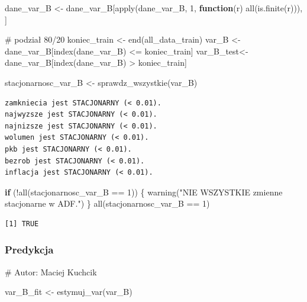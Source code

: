\documentclass[
  polish,
  letterpaper,
  DIV=11,
  numbers=noendperiod]{scrartcl}
\newenvironment{Shaded}{\begin{snugshade}}{\end{snugshade}}
\newcommand{\CommentTok}[1]{\textcolor[rgb]{0.37,0.37,0.37}{#1}}
\newcommand{\ControlFlowTok}[1]{\textcolor[rgb]{0.00,0.23,0.31}{\textbf{#1}}}
\newcommand{\DecValTok}[1]{\textcolor[rgb]{0.68,0.00,0.00}{#1}}
\newcommand{\FunctionTok}[1]{\textcolor[rgb]{0.28,0.35,0.67}{#1}}
\newcommand{\NormalTok}[1]{\textcolor[rgb]{0.00,0.23,0.31}{#1}}
\newcommand{\OtherTok}[1]{\textcolor[rgb]{0.00,0.23,0.31}{#1}}
\newcommand{\SpecialCharTok}[1]{\textcolor[rgb]{0.37,0.37,0.37}{#1}}
\newcommand{\StringTok}[1]{\textcolor[rgb]{0.13,0.47,0.30}{#1}}
\begin{document}
\begin{Shaded}
\begin{Highlighting}[]
\NormalTok{dane\_var\_B }\OtherTok{\textless{}{-}}\NormalTok{ dane\_var\_B[}\FunctionTok{apply}\NormalTok{(dane\_var\_B, }\DecValTok{1}\NormalTok{, }
                         \ControlFlowTok{function}\NormalTok{(r) }\FunctionTok{all}\NormalTok{(}\FunctionTok{is.finite}\NormalTok{(r))), ]}

\CommentTok{\# podział 80/20}
\NormalTok{koniec\_train }\OtherTok{\textless{}{-}} \FunctionTok{end}\NormalTok{(all\_data\_train)}
\NormalTok{var\_B }\OtherTok{\textless{}{-}}\NormalTok{ dane\_var\_B[}\FunctionTok{index}\NormalTok{(dane\_var\_B) }\SpecialCharTok{\textless{}=}\NormalTok{ koniec\_train]}
\NormalTok{var\_B\_test}\OtherTok{\textless{}{-}}\NormalTok{ dane\_var\_B[}\FunctionTok{index}\NormalTok{(dane\_var\_B) }\SpecialCharTok{\textgreater{}}\NormalTok{  koniec\_train]}

\NormalTok{stacjonarnosc\_var\_B }\OtherTok{\textless{}{-}} \FunctionTok{sprawdz\_wszystkie}\NormalTok{(var\_B)}
\end{Highlighting}
\end{Shaded}

\begin{verbatim}
zamkniecia jest STACJONARNY (< 0.01).
najwyzsze jest STACJONARNY (< 0.01).
najnizsze jest STACJONARNY (< 0.01).
wolumen jest STACJONARNY (< 0.01).
pkb jest STACJONARNY (< 0.01).
bezrob jest STACJONARNY (< 0.01).
inflacja jest STACJONARNY (< 0.01).
\end{verbatim}

\begin{Shaded}
\begin{Highlighting}[]
\ControlFlowTok{if}\NormalTok{ (}\SpecialCharTok{!}\FunctionTok{all}\NormalTok{(stacjonarnosc\_var\_B }\SpecialCharTok{==} \DecValTok{1}\NormalTok{)) \{}
  \FunctionTok{warning}\NormalTok{(}\StringTok{"NIE WSZYSTKIE zmienne stacjonarne w ADF."}\NormalTok{)}
\NormalTok{\}}
\FunctionTok{all}\NormalTok{(stacjonarnosc\_var\_B }\SpecialCharTok{==} \DecValTok{1}\NormalTok{)}
\end{Highlighting}
\end{Shaded}

\begin{verbatim}
[1] TRUE
\end{verbatim}

\subsubsection{Predykcja}\label{predykcja-1}

\begin{Shaded}
\begin{Highlighting}[]
\CommentTok{\# Autor: Maciej Kuchcik}

\NormalTok{var\_B\_fit }\OtherTok{\textless{}{-}} \FunctionTok{estymuj\_var}\NormalTok{(var\_B)}
\end{Highlighting}
\end{Shaded}
\end{document}
